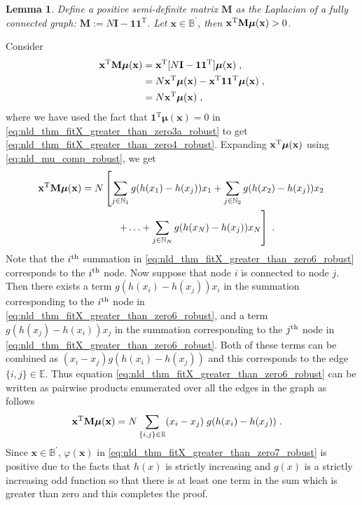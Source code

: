 \documentclass[onecolumn, draft, 12pt]{IEEEtran}
\newcommand{\Cs}{\mathbb{B}}
\newcommand{\Ns}{\mathbb{N}}
\newcommand{\Cprime}{\Cs^{'}}
\newcommand{\onevect}{\mathbf{1}}
\newcommand{\onevectT}{\mathbf{1}^{\mathrm{T}}}
\newcommand{\I}{\mathbf{I}}
\newcommand{\Pm}{\mathbf{M}}
\newcommand{\xX}{\mathbf{x}}
\newcommand{\mx}{\mathbf{\boldsymbol\mu}(\mathbf{x})}
\newcommand{\fitX}{ \varphi(\mathbf{x})}
\newtheorem{lem}{Lemma}
\begin{document}
\begin{lem} \label{nld_lem_XMmx_positive} 
Define a positive semi-definite matrix $\Pm$ as the Laplacian of a fully connected graph: $\Pm:=N \I - \onevect \onevectT$. Let $\xX \in \Cprime$, then $\xX^{\rm T} \Pm \mx >0$.
\end{lem}
\begin{IEEEproof}
Consider
\begin{align}
\xX^{\rm T} \Pm \mx     &  =  \xX^{\rm T}[N \I - \onevect \onevectT ] \mx \;,\\
\label{eq:nld_thm_fitX_greater_than_zero3a_robust}
					    &  =  N \xX^{\rm T} \mx - \xX^{\rm T} \onevect \onevectT \mx \;,\\
\label{eq:nld_thm_fitX_greater_than_zero4_robust}
     &  =  N \xX^{\rm T} \mx \;,
\end{align}
where we have used the fact that $\onevectT \mx=0$ in \eqref{eq:nld_thm_fitX_greater_than_zero3a_robust} to get \eqref{eq:nld_thm_fitX_greater_than_zero4_robust}. Expanding $\xX^{\rm T} \mx$ using \eqref{eq:nld_mu_comp_robust}, we get 
\begin{align} 
\nonumber
\label{eq:nld_thm_fitX_greater_than_zero6_robust} 
\xX^{\rm T} \Pm \mx  &  = N \left [ \displaystyle\sum_{j \in \Ns_{1}} g(h(x_1)-h(x_j)) x_1 + \displaystyle\sum_{j \in \Ns_{2}} g(h(x_2)-h(x_j)) x_2 \right. \\
	 & \left. \hspace{0.5 in}+ \ldots + \displaystyle\sum_{j \in \Ns_{N}} g(h(x_N)-h(x_j)) x_N \right ]\;. 
\end{align}
Note that the $i^{\rm th}$ summation in \eqref{eq:nld_thm_fitX_greater_than_zero6_robust} corresponds to the $i^{\rm th}$ node. Now suppose that node $i$ is connected to node $j$. Then there exists a term $g(h(x_i)-h(x_j)) x_i$ in the summation corresponding to the $i^{\rm th}$ node in \eqref{eq:nld_thm_fitX_greater_than_zero6_robust}, and a term $g(h(x_j)-h(x_i)) x_j$ in the summation corresponding to the $j^{\rm th}$ node in \eqref{eq:nld_thm_fitX_greater_than_zero6_robust}. Both of these terms can be combined as $(x_i-x_j) g(h(x_i)-h(x_j))$ and this corresponds to the edge $\{i,j\} \in \mathbb{E}$. Thus equation \eqref{eq:nld_thm_fitX_greater_than_zero6_robust} can be written as pairwise products enumerated over all the edges in the graph as follows
\begin{align} 
\label{eq:nld_thm_fitX_greater_than_zero7_robust}    
\xX^{\rm T} \Pm \mx & = N \displaystyle \sum_{\{i,j\} \in \mathbb{E}} (x_i-x_j) \; g(h(x_i)-h(x_j)) \;.
\end{align}
Since $\xX \in \Cprime$, $\fitX$ in \eqref{eq:nld_thm_fitX_greater_than_zero7_robust} is positive due to the facts that $h(x)$ is strictly increasing and $g(x)$ is a strictly increasing odd function so that there is at least one term in the sum which is greater than zero and this completes the proof. 
\end{IEEEproof}
\end{document}
